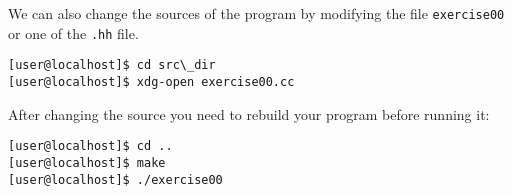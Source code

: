 \documentclass[12pt,a4paper]{article}
\begin{document}
We can also change the sources of the program by modifying the file
\lstinline{exercise00} or one of the \lstinline{.hh} file.
\begin{lstlisting}
[user@localhost]$ cd src\_dir
[user@localhost]$ xdg-open exercise00.cc
\end{lstlisting}
After changing the source you need to rebuild your program before
running it:
\begin{lstlisting}
[user@localhost]$ cd ..
[user@localhost]$ make
[user@localhost]$ ./exercise00
\end{lstlisting}%
\end{document}
